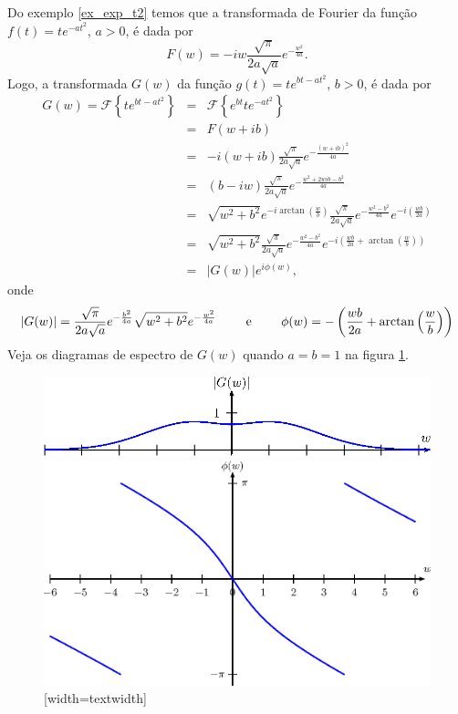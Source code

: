 \begin{ex} Do exemplo \ref{ex_exp_t2} temos que a transformada de Fourier da função $f(t)=t e^{-at^2}$, $a>0$, é dada por
\begin{equation}
F(w)=-iw\frac{\sqrt{\pi}}{2a\sqrt{a}}e^{-\frac{w^2}{4a}}.
\end{equation}
Logo, a transformada $G(w)$ da função $g(t)=t e^{bt-at^2}$, $b>0$, é dada por
\begin{eqnarray*}
G(w)=\mathcal{F}\left\{t e^{bt-at^2}\right\}&=&\mathcal{F}\left\{e^{bt}t e^{-at^2}\right\}\\
&=&F(w+ib)\\
&=&-i(w+ib)\frac{\sqrt{\pi}}{2a\sqrt{a}}e^{-\frac{(w+ib)^2}{4a}}\\
&=&(b-iw)\frac{\sqrt{\pi}}{2a\sqrt{a}}e^{-\frac{w^2+2wib-b^2}{4a}}\\
&=&\sqrt{w^2+b^2}e^{-i\arctan\left(\frac{w}{b}\right)}\frac{\sqrt{\pi}}{2a\sqrt{a}}e^{-\frac{w^2-b^2}{4a}}e^{-i\left(\frac{wb}{2a}\right)}\\
&=&\sqrt{w^2+b^2}\frac{\sqrt{\pi}}{2a\sqrt{a}}e^{-\frac{w^2-b^2}{4a}}e^{-i\left(\frac{wb}{2a}+\arctan\left(\frac{w}{b}\right)\right)}\\
&=&|G(w)|e^{i\phi(w)},
\end{eqnarray*}
onde
\begin{eqnarray*}
|G(w)|=\frac{\sqrt{\pi}}{2a\sqrt{a}}e^{-\frac{b^2}{4a}}\sqrt{w^2+b^2}e^{-\frac{w^2}{4a}}\qquad\hbox{ e }\qquad \phi(w)=-\left(\frac{wb}{2a}+\arctan\left(\frac{w}{b}\right)\right)
\end{eqnarray*}
Veja os diagramas de espectro de $G(w)$ quando $a=b=1$ na figura \ref{diag_espec_trans_4}.
\begin{figure}[!ht]
\begin{center}
\includegraphics[width=\textwidth]{cap_propriedades_transformada/pics/figura_2}\vspace{10pt}
\includegraphics[width=\textwidth]{cap_propriedades_transformada/pics/figura_3}
[width=textwidth]\end{center}
\caption{\label{diag_espec_trans_4}}
\end{figure}
\end{ex}

